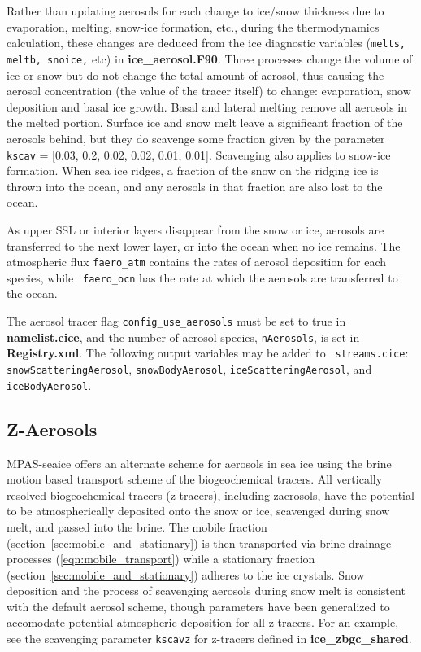 Rather than updating aerosols for each change to ice/snow thickness
due to evaporation, melting,  snow-ice formation, etc., during the
thermodynamics calculation, these  changes are deduced from the
ice diagnostic variables  ({\tt melts, meltb, snoice,} etc) in {\bf
  ice\_aerosol.F90}.   Three processes change the volume of ice or
snow but do not change the  total amount of aerosol, thus causing the
aerosol concentration  (the value of the tracer itself) to change:
evaporation, snow deposition  and basal ice growth.  Basal and lateral
melting remove all  aerosols in the melted portion.  Surface ice and
snow melt leave a  significant fraction of the aerosols behind, but
they do scavenge some fraction given by the parameter  {\tt
  kscav} = [0.03, 0.2, 0.02, 0.02, 0.01, 0.01].   Scavenging also applies
to snow-ice formation.   When sea ice ridges, a fraction of the snow
on the ridging ice is  thrown into the ocean, and any aerosols in that
fraction are also  lost to the ocean.

As upper SSL or interior layers disappear from the snow or ice,
aerosols are transferred to the  next lower layer, or into the ocean
when no ice remains.   The atmospheric flux {\tt faero\_atm} contains
the rates of aerosol  deposition for each species, while {\tt
  faero\_ocn} has the rate at  which the aerosols are transferred to the ocean.

The aerosol tracer flag {\tt config\_use\_aerosols} must be set to true in {\bf
  namelist.cice}, and the number  of aerosol species, {\tt nAerosols}, is set in {\bf
  Registry.xml}.  The following output variables may be added to {\tt
  streams.cice}: {\tt snowScatteringAerosol}, {\tt snowBodyAerosol},
{\tt iceScatteringAerosol}, and {\tt iceBodyAerosol}.


\subsection{Z-Aerosols}

MPAS-seaice  offers an alternate scheme for aerosols
in sea ice using the brine motion based transport scheme of the
biogeochemical tracers.   All vertically resolved biogeochemical
tracers (z-tracers), including
zaerosols, have the potential to be atmospherically deposited onto the
snow or ice, scavenged during snow melt, and passed into the brine.
The mobile fraction (section~\ref{sec:mobile_and_stationary}) is then transported via brine drainage processes
(\ref{eqn:mobile_transport})
while a stationary fraction (section~\ref{sec:mobile_and_stationary}) adheres
to the ice crystals.  Snow deposition and the process of
scavenging aerosols during snow melt is consistent with the default
aerosol scheme, though parameters have been generalized to accomodate
potential atmospheric deposition for all z-tracers.  For an example,
see the scavenging parameter {\tt kscavz} for z-tracers defined in {\bf
  ice\_zbgc\_shared}.

